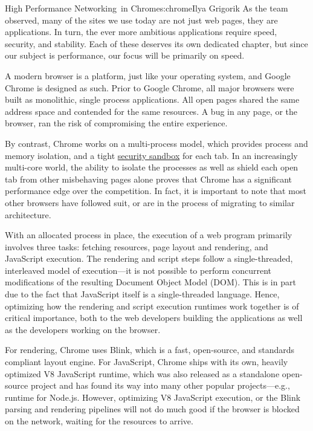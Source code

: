 \begin{aosachapter}{High Performance Networking~in Chrome}{s:chrome}{Ilya Grigorik}
As the team observed, many of the sites we use today are not just web
pages, they are applications. In turn, the ever more ambitious
applications require speed, security, and stability. Each of these
deserves its own dedicated chapter, but since our subject is
performance, our focus will be primarily on speed.


A modern browser is a platform, just like your operating system, and
Google Chrome is designed as such. Prior to Google Chrome, all major
browsers were built as monolithic, single process applications. All open
pages shared the same address space and contended for the same
resources. A bug in any page, or the browser, ran the risk of
compromising the entire experience.

By contrast, Chrome works on a multi-process model, which provides
process and memory isolation, and a tight
\href{http://dev.chromium.org/developers/design-documents/sandbox}{security
sandbox} for each tab. In an increasingly multi-core world, the ability
to isolate the processes as well as shield each open tab from other
misbehaving pages alone proves that Chrome has a significant performance
edge over the competition. In fact, it is important to note that most
other browsers have followed suit, or are in the process of migrating to
similar architecture.

With an allocated process in place, the execution of a web program
primarily involves three tasks: fetching resources, page layout and
rendering, and JavaScript execution. The rendering and script steps
follow a single-threaded, interleaved model of execution---it is not
possible to perform concurrent modifications of the resulting Document
Object Model (DOM). This is in part due to the fact that JavaScript
itself is a single-threaded language. Hence, optimizing how the
rendering and script execution runtimes work together is of critical
importance, both to the web developers building the applications as well
as the developers working on the browser.

For rendering, Chrome uses Blink, which is a fast, open-source, and
standards compliant layout engine. For JavaScript, Chrome ships with its
own, heavily optimized V8 JavaScript runtime, which was also released as
a standalone open-source project and has found its way into many other
popular projects---e.g., runtime for Node.js. However, optimizing V8
JavaScript execution, or the Blink parsing and rendering pipelines will
not do much good if the browser is blocked on the network, waiting for
the resources to arrive.


\end{aosachapter}
